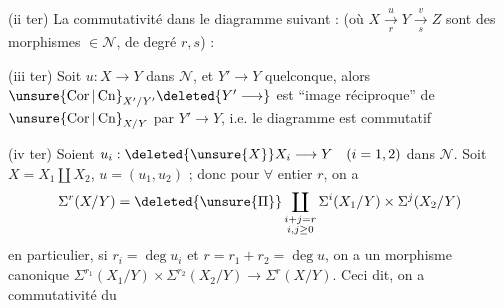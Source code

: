 (ii ter) La commutativité dans le diagramme suivant :
(où $X\xrightarrow[r]{u}Y\xrightarrow[s]{v}Z$ sont des morphismes $\in\mathcal N$, de degré $r,s$) :

(iii ter) Soit $u:X\longrightarrow Y$ dans $\mathcal N$, et $Y'\longrightarrow Y$ quelconque, alors $\unsure{\operatorname{Cor}|\operatorname{Cn}}_{X'/Y'}\deleted{Y'\longrightarrow}$ est ``image réciproque'' de $\unsure{\operatorname{Cor}|\operatorname{Cn}}_{X/Y}$ par $Y'\longrightarrow Y$, i.e. le diagramme
est commutatif

(iv ter) Soient $u_i:\deleted{\unsure{X}}X_i\longrightarrow Y\quad(i=1,2)$ dans $\mathcal N$. Soit $X=X_1\amalg X_2$, $u=(u_1,u_2)$ ; donc pour $\forall$ entier $r$, on a
\[
\Sigma^r(X/Y)=\deleted{\unsure{\Pi}}\coprod_{\substack{i+j=r\\i,j\geq0}}\Sigma^i(X_1/Y)\times\Sigma^j(X_2/Y)
\]
en particulier, si $r_i=\deg u_i$ et $r=r_1+r_2=\deg u$, on a un morphisme  canonique $\Sigma^{r_1}(X_1/Y)\times\Sigma^{r_2}(X_2/Y)\longrightarrow\Sigma^r(X/Y)$. Ceci dit, on a commutativité du

